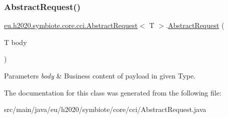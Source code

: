\subsubsection{\texorpdfstring{Abstract\+Request()}{AbstractRequest()}}
{\footnotesize\ttfamily \hyperlink{classeu_1_1h2020_1_1symbiote_1_1core_1_1cci_1_1AbstractRequest}{eu.\+h2020.\+symbiote.\+core.\+cci.\+Abstract\+Request}$<$ T $>$.\hyperlink{classeu_1_1h2020_1_1symbiote_1_1core_1_1cci_1_1AbstractRequest}{Abstract\+Request} (\begin{DoxyParamCaption}\item[{T}]{body }\end{DoxyParamCaption})}


\begin{DoxyParams}{Parameters}
{\em body} & Business content of payload in given Type. \\
\hline
\end{DoxyParams}


The documentation for this class was generated from the following file\+:\begin{DoxyCompactItemize}
\item 
src/main/java/eu/h2020/symbiote/core/cci/Abstract\+Request.\+java\end{DoxyCompactItemize}

